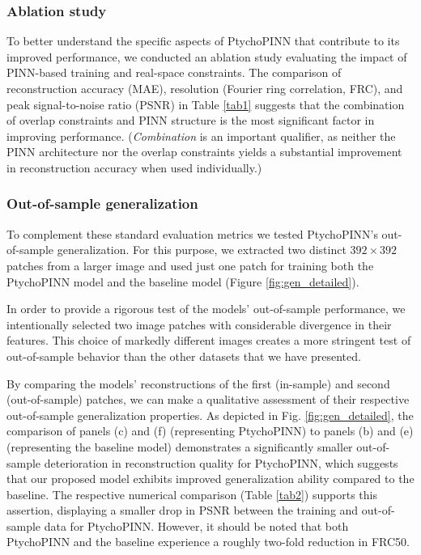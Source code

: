 \documentclass[sn-mathphys]{sn-jnl}%
\theoremstyle{thmstyleone}%
\theoremstyle{thmstyletwo}%
\theoremstyle{thmstylethree}%
\begin{document}
\subsubsection{Ablation study}

To better understand the specific aspects of PtychoPINN that contribute to its improved performance, we conducted an ablation study evaluating the impact of PINN-based training and real-space constraints. The comparison of reconstruction accuracy (MAE), resolution (Fourier ring correlation, FRC), and peak signal-to-noise ratio (PSNR) in Table \ref{tab1} suggests that the combination of overlap constraints and PINN structure is the most significant factor in improving performance. (\emph{Combination} is an important qualifier, as neither the PINN architecture nor the overlap constraints yields a substantial improvement in reconstruction accuracy when used individually.)

\subsubsection{Out-of-sample generalization}
To complement these standard evaluation metrics we tested PtychoPINN's out-of-sample generalization. For this purpose, we extracted two distinct $392 \times 392$ patches from a larger image and used just one patch for training both the PtychoPINN model and the baseline model (Figure \ref{fig:gen_detailed}).

In order to provide a rigorous test of the models' out-of-sample performance, we intentionally selected two image patches with considerable divergence in their features. This choice of markedly different images creates a more stringent test of out-of-sample behavior than the other datasets that we have presented.

By comparing the models' reconstructions of the first (in-sample) and second (out-of-sample) patches, we can make a qualitative assessment of their respective out-of-sample generalization properties. As depicted in Fig. \ref{fig:gen_detailed}, the comparison of panels (c) and (f) (representing PtychoPINN) to panels (b) and (e) (representing the baseline model) demonstrates a significantly smaller out-of-sample deterioration in reconstruction quality for PtychoPINN, which suggests that our proposed model exhibits improved generalization ability compared to the baseline. The respective numerical comparison (Table \ref{tab2}) supports this assertion, displaying a smaller drop in PSNR between the training and out-of-sample data for PtychoPINN. However, it should be noted that both PtychoPINN and the baseline experience a roughly two-fold reduction in FRC50.
\end{document}
